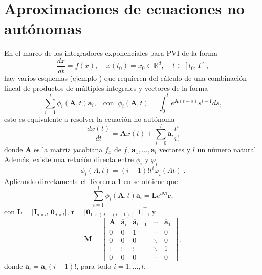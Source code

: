 \section{Aproximaciones de ecuaciones no autónomas}
En el marco de los integradores exponenciales para PVI de la forma
\begin{equation*}
	\frac{dx}{dt}=f(x),  \;\;\;\; x(t_0)=x_0 \in \mathbb{R}^{d},   \;\;\;\; t\in[t_0,T],
\end{equation*}
hay varios esquemas (ejemplo \cite{tokman2006efficient,delaCruz07,hochbruck2011exponential}) que requieren del cálculo de una combinación lineal de productos de múltiples integrales y vectores de la forma
\begin{equation*}
	\sum\limits_{i=1}^{l}\phi _{i}(\mathbf{A},t)\mathbf{a}_{i},   \;\;\;\mathrm{con} \;\; \phi _{i}(\mathbf{A},t)=\int_{0}^{t}e^{\mathbf{A}(t-s)}s^{i-1}ds,
\end{equation*}
esto es equivalente a resolver la ecuación no autónoma
\begin{equation*}
	\frac{dx(t)}{dt} = \mathbf{A}x(t)+\sum\limits_{i=0}^{l}\mathbf{a}_i\frac{t^i}{i!}
\end{equation*}
donde $\mathbf{A}$ es la matriz jacobiana $f_x$ de $f$, $\mathbf{a}_1,\ldots,\mathbf{a}_l$ vectores y $l$ un número natural. Además, existe una relación directa entre $\phi_i$ y $\varphi_i$
\begin{equation*}
	\phi_i(A,t)=(i-1)!t^i\varphi_i(At)\;.
\end{equation*}
Aplicando directamente el Teorema 1 en \cite{carbonell2008computing} se obtiene que\cite{carbonell2008computing,jimenez2006local}
\begin{equation}\label{sum2_phiXv}
\sum\limits_{i=1}^{l}\phi _{i}(\mathbf{A},t)\mathbf{a}_{i} = \mathbf{L} e^{t \mathbf{M}}\mathbf{r},
\end{equation}
con $\mathbf{L}=[\mathbf{I}_{d\times d}$ $\mathbf{0}_{d\times l}]$, $\mathbf{r}=[\mathbf{0}_{1\times (d+(l-1))}$ $1]^{\intercal }$, y
\begin{equation*}
\mathbf{M}=\left[
\begin{array}{ccccc}
\mathbf{A} & \overline{\mathbf{a}}_{l} & \overline{\mathbf{a}}_{l-1} & \cdots & \overline{\mathbf{a}}_{1} \\ 
0 & 0 & 1 & \cdots & 0 \\
0 & 0 & 0 & \ddots & 0 \\
\vdots & \vdots & \vdots & \ddots & 1 \\
0 & 0 & 0 & \cdots & 0
\end{array}%
\right],  \label{matrixH2}
\end{equation*}%
donde $\overline{\mathbf{a}}_{i}=\mathbf{a}_{i}(i-1)!$, para todo $i=1,\ldots ,l$.

